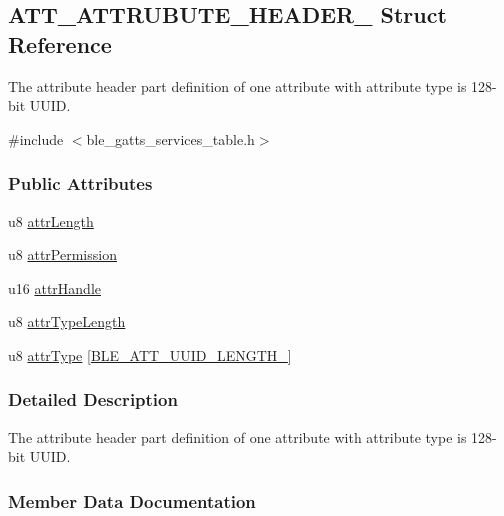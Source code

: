\hypertarget{struct_a_t_t___a_t_t_r_u_b_u_t_e___h_e_a_d_e_r__16}{}\subsection{A\+T\+T\+\_\+\+A\+T\+T\+R\+U\+B\+U\+T\+E\+\_\+\+H\+E\+A\+D\+E\+R\+\_ Struct Reference}
\label{struct_a_t_t___a_t_t_r_u_b_u_t_e___h_e_a_d_e_r__16}


The attribute header part definition of one attribute with attribute type is 128-\/bit U\+U\+ID.  




{\ttfamily \#include $<$ble\+\_\+gatts\+\_\+services\+\_\+table.\+h$>$}

\subsubsection*{Public Attributes}
\begin{DoxyCompactItemize}
\item 
u8 \hyperlink{struct_a_t_t___a_t_t_r_u_b_u_t_e___h_e_a_d_e_r__16_a26403b1bd76f2509b1db0cd90de2b3a0}{attr\+Length}
\item 
u8 \hyperlink{struct_a_t_t___a_t_t_r_u_b_u_t_e___h_e_a_d_e_r__16_a9f0c8faa591d89f686b434d4cef4f0e9}{attr\+Permission}
\item 
u16 \hyperlink{struct_a_t_t___a_t_t_r_u_b_u_t_e___h_e_a_d_e_r__16_a409de9ec4737152ad06212138152d5dd}{attr\+Handle}
\item 
u8 \hyperlink{struct_a_t_t___a_t_t_r_u_b_u_t_e___h_e_a_d_e_r__16_ab6e70a61429f1a5833591f83bcfee449}{attr\+Type\+Length}
\item 
u8 \hyperlink{struct_a_t_t___a_t_t_r_u_b_u_t_e___h_e_a_d_e_r__16_a6de7a56a87ecba5790d8591e10c989eb}{attr\+Type} \mbox{[}\hyperlink{group___b_l_e___a_t_t___u_u_i_d___l_e_n_g_t_h___t_y_p_e_s_ga5a9cf4995e35a99b93e317eb81288e72}{B\+L\+E\+\_\+\+A\+T\+T\+\_\+\+U\+U\+I\+D\+\_\+\+L\+E\+N\+G\+T\+H\+\_}\mbox{]}
\end{DoxyCompactItemize}


\subsubsection{Detailed Description}
The attribute header part definition of one attribute with attribute type is 128-\/bit U\+U\+ID. 

\subsubsection{Member Data Documentation}
